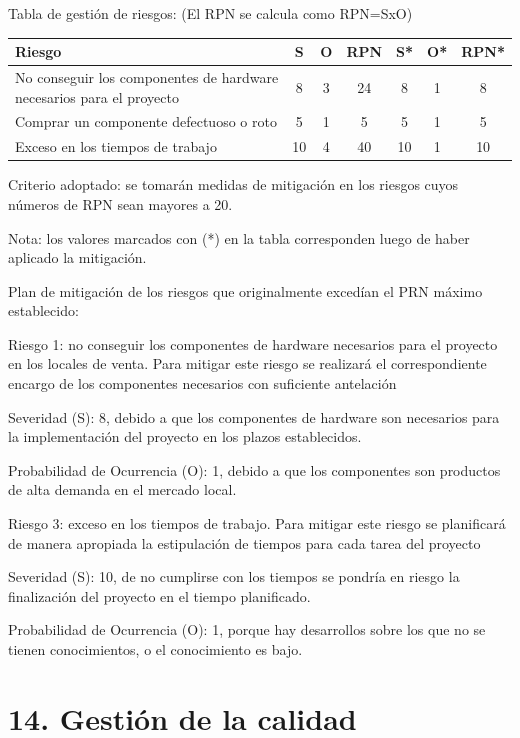 \documentclass[
11pt, %
]{charter}
\begin{document}
Tabla de gestión de riesgos:      (El RPN se calcula como RPN=SxO)

\begin{table}[htpb]
\centering
\begin{tabularx}{\linewidth}{@{}|X|c|c|c|c|c|c|@{}}
\hline
\rowcolor[HTML]{C0C0C0} 
Riesgo & S & O & RPN & S* & O* & RPN* \\ \hline
No conseguir los componentes de hardware necesarios  para el proyecto       & 8  & 3  &  24   & 8  &  1  &  8      \\ \hline
Comprar un componente defectuoso o roto       & 5  & 1  &  5   &  5  & 1  &  5    \\ \hline
Exceso en los tiempos de trabajo       & 10  & 4  &  40   &   10 &  1 & 10     \\ \hline
\end{tabularx}%
\end{table}

Criterio adoptado: 
se tomarán medidas de mitigación en los riesgos cuyos números de RPN sean mayores a 20.

Nota: los valores marcados con (*) en la tabla corresponden luego de haber aplicado la mitigación.


Plan de mitigación de los riesgos que originalmente excedían el PRN máximo establecido:
 
Riesgo 1: no conseguir los componentes de hardware necesarios  para el proyecto en los locales de venta. Para mitigar este riesgo se realizará el correspondiente encargo de los componentes necesarios con suficiente antelación 


Severidad (S): 8, debido a que los componentes de hardware son necesarios para la implementación del proyecto en los plazos establecidos.  

Probabilidad de Ocurrencia (O):  1, debido a que los componentes son productos de alta demanda en el mercado local.
 
Riesgo 3: exceso en los tiempos de trabajo. Para mitigar este riesgo se planificará de manera apropiada la estipulación de tiempos para cada tarea del proyecto

Severidad (S): 10, de no cumplirse con los tiempos se pondría en riesgo la finalización del proyecto en el tiempo planificado. 

Probabilidad de Ocurrencia (O): 1, porque hay desarrollos sobre los que no se tienen conocimientos, o el conocimiento es bajo.



\section{14. Gestión de la calidad}
\label{sec:calidad}
\end{document}
